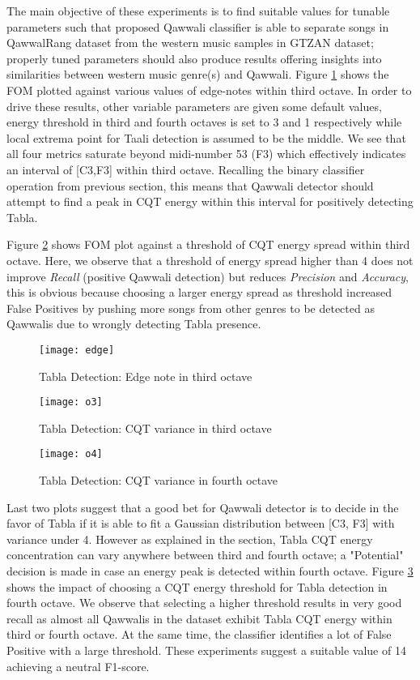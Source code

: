 \documentclass{article}
\begin{document}
The main objective of these experiments is to find suitable values for tunable parameters such that proposed Qawwali classifier is able to separate songs in QawwalRang dataset from the western music samples in GTZAN dataset; properly tuned parameters should also produce results offering insights into similarities between western music genre(s) and Qawwali. Figure \ref{fig:src_edge} shows the FOM plotted against various values of edge-notes within third octave. In order to drive these results, other variable parameters are given some default values, energy threshold in third and fourth octaves is set to 3 and 1 respectively while local extrema point for Taali detection is assumed to be the middle.  We see that all four metrics saturate beyond midi-number 53 (F3) which effectively indicates an interval of [C3,F3] within third octave. Recalling the binary classifier operation from previous section, this means that Qawwali detector should attempt to find a peak in CQT energy within this interval for positively detecting Tabla.

Figure \ref{fig:src_o3} shows FOM plot against a threshold of CQT energy spread within third octave. Here, we observe that a threshold of energy spread higher than 4 does not improve \textit{Recall} (positive Qawwali detection) but reduces \textit{Precision} and \textit{Accuracy}, this is obvious because choosing a larger energy spread as threshold increased False Positives by pushing more songs from other genres to be detected as Qawwalis due to wrongly detecting Tabla presence.
\begin{figure}[htbp]
  \centering
  \texttt{[image: edge]}
  \caption{Tabla Detection: Edge note in third octave}
\label{fig:src_edge}
\end{figure}
\begin{figure}[htbp]
  \centering
  \texttt{[image: o3]}
  \caption{Tabla Detection: CQT variance in third octave}
\label{fig:src_o3}
\end{figure}
\begin{figure}[htbp]
  \centering
  \texttt{[image: o4]}
  \caption{Tabla Detection: CQT variance in fourth octave}
\label{fig:src_o4}
\end{figure}
Last two plots suggest that a good bet for Qawwali detector is to decide in the favor of Tabla if it is able to fit a Gaussian distribution between [C3, F3] with variance under 4. However as explained in the section, Tabla CQT energy concentration can vary anywhere between third and fourth octave; a "Potential" decision is made in case an energy peak is detected within fourth octave. Figure \ref{fig:src_o4} shows the impact of choosing a CQT energy threshold for Tabla detection in fourth octave. We observe that selecting a higher threshold results in very good recall as almost all Qawwalis in the dataset exhibit Tabla CQT energy within third or fourth octave. At the same time, the classifier identifies a lot of False Positive with a large threshold. These experiments suggest a suitable value of 14 achieving a neutral F1-score.
\end{document}
